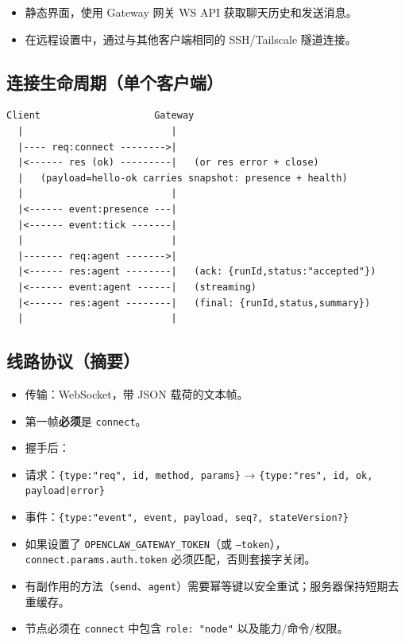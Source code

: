 \begin{itemize}
  \item 静态界面，使用 Gateway 网关 WS API 获取聊天历史和发送消息。
  \item 在远程设置中，通过与其他客户端相同的 SSH/Tailscale 隧道连接。
\end{itemize}


\subsection{连接生命周期（单个客户端）}


\begin{lstlisting}
Client                    Gateway
  |                          |
  |---- req:connect -------->|
  |<------ res (ok) ---------|   (or res error + close)
  |   (payload=hello-ok carries snapshot: presence + health)
  |                          |
  |<------ event:presence ---|
  |<------ event:tick -------|
  |                          |
  |------- req:agent ------->|
  |<------ res:agent --------|   (ack: {runId,status:"accepted"})
  |<------ event:agent ------|   (streaming)
  |<------ res:agent --------|   (final: {runId,status,summary})
  |                          |
\end{lstlisting}


\subsection{线路协议（摘要）}


\begin{itemize}
  \item 传输：WebSocket，带 JSON 载荷的文本帧。
  \item 第一帧\textbf{必须}是 \texttt{connect}。
  \item 握手后：
  \item 请求：\texttt{\{type:"req", id, method, params\}} → \texttt{\{type:"res", id, ok, payload|error\}}
  \item 事件：\texttt{\{type:"event", event, payload, seq?, stateVersion?\}}
  \item 如果设置了 \texttt{OPENCLAW\_GATEWAY\_TOKEN}（或 \texttt{--token}），\texttt{connect.params.auth.token} 必须匹配，否则套接字关闭。
  \item 有副作用的方法（\texttt{send}、\texttt{agent}）需要幂等键以安全重试；服务器保持短期去重缓存。
  \item 节点必须在 \texttt{connect} 中包含 \texttt{role: "node"} 以及能力/命令/权限。
\end{itemize}


